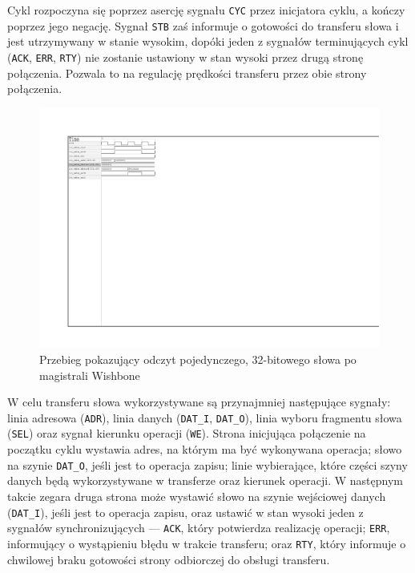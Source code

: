 Cykl rozpoczyna się poprzez asercję sygnału \texttt{CYC} przez inicjatora cyklu, a kończy poprzez jego negację. Sygnał \texttt{STB} zaś informuje o gotowości do transferu słowa i jest utrzymywany w stanie wysokim, dopóki jeden z sygnałów terminujących cykl (\texttt{ACK}, \texttt{ERR}, \texttt{RTY}) nie zostanie ustawiony w stan wysoki przez drugą stronę połączenia. Pozwala to na regulację prędkości transferu przez obie strony połączenia.

\begin{figure}[H]
    \centering
    \includegraphics[scale=1.5,trim={2.54cm 14.73cm 19.6cm 2.9cm},clip]{implementation/classic-read.pdf}
    \caption{Przebieg pokazujący odczyt pojedynczego, 32-bitowego słowa po magistrali Wishbone}
    \label{fig:wishbone-classic-read}
\end{figure}

W celu transferu słowa wykorzystywane są przynajmniej następujące sygnały: linia adresowa (\texttt{ADR}), linia danych (\texttt{DAT_I}, \texttt{DAT_O}), linia wyboru fragmentu słowa (\texttt{SEL}) oraz sygnał kierunku operacji (\texttt{WE}). Strona inicjująca połączenie na początku cyklu wystawia adres, na którym ma być wykonywana operacja; słowo na szynie \texttt{DAT_O}, jeśli jest to operacja zapisu; linie wybierające, które części szyny danych będą wykorzystywane w transferze oraz kierunek operacji. W następnym takcie zegara druga strona może wystawić słowo na szynie wejściowej danych (\texttt{DAT_I}), jeśli jest to operacja zapisu, oraz ustawić w stan wysoki jeden z sygnałów synchronizujących --- \texttt{ACK}, który potwierdza realizację operacji; \texttt{ERR}, informujący o wystąpieniu błędu w trakcie transferu; oraz \texttt{RTY}, który informuje o chwilowej braku gotowości strony odbiorczej do obsługi transferu.

